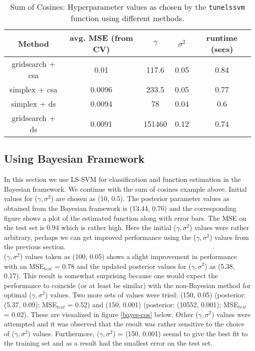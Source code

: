 \documentclass[paper=a4, fontsize=11pt]{scrartcl} %
\numberwithin{equation}{section} %
\begin{document}
\begin{table}[ht]
\centering
\begin{tabular}{|c|c|c|c|c}
\hline
Method & avg. MSE (from CV) & $\gamma$ & $\sigma^2$ & runtime (secs) \\
\hline
gridsearch + csa & 0.01 & 117.6 & 0.05 & 0.84 \\
simplex + csa & 0.0096 & 233.5 & 0.05 & 0.77 \\
simplex + ds & 0.0094 & 78 & 0.04 & 0.6 \\
gridsearch + ds & 0.0091 & 151460 & 0.12 & 0.74\\
\hline
\end{tabular}
\caption{Sum of Cosines: Hyperparameter values as chosen by the \texttt{tunelssvm} function using different methods.}
\label{cos-tune}
\end{table}

\subsection{Using Bayesian Framework}

In this section we use LS-SVM for classification and function estimation in the Bayesian framework. We continue with the sum of cosines example above. Initial values for ($\gamma, \sigma^2$) are chosen as (10, 0.5). The posterior parameter values as obtained from the Bayesian framework is (13.44, 0.76) and the corresponding figure shows a plot of the estimated function along with error bars. The MSE on the test set is 0.94 which is rather high. Here the initial ($\gamma, \sigma^2$) values were rather arbitrary, perhaps we can get improved performance using the ($\gamma, \sigma^2$) values from the previous section.\\

($\gamma, \sigma^2$) values taken as (100, 0.05) shows a slight improvement in performance with an MSE$_{test}$ = 0.78 and the updated posterior values for ($\gamma, \sigma^2$) as (5.38, 0.17). This result is somewhat surprising because one would expect the performance to coincide (or at least be similar) with the non-Bayesian method for optimal ($\gamma, \sigma^2$) values. Two more sets of values were tried: (150, 0.05) (posterior: (5.37, 0.09); MSE$_{test}$ = 0.52) and (150, 0.001) (posterior: (10552, 0.001); MSE$_{test}$ = 0.02). These are visualized in figure \ref{bayes-cos} below. Other ($\gamma, \sigma^2$) values were attempted and it was observed that the result was rather sensitive to the choice of ($\gamma, \sigma^2$) values. Furthermore, ($\gamma, \sigma^2$) = (150, 0.001) seemd to give the best fit to the training set and as a result had the smallest error on the test set.\\
\end{document}
